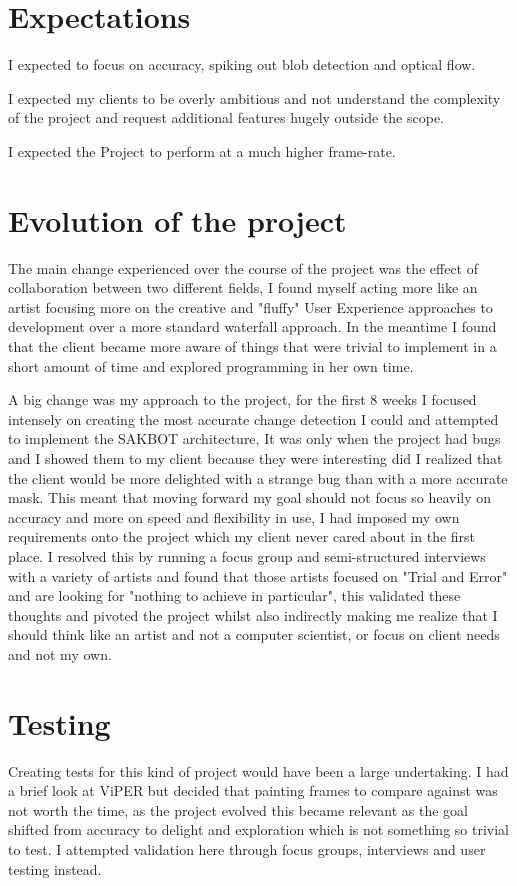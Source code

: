 \documentclass[a4paper]{report}
\begin{document}
\section{Expectations}
I expected to focus on accuracy, spiking out blob detection and optical flow.

I expected my clients to be overly ambitious and not understand the complexity of the project and request additional features hugely outside the scope.

I expected the Project to perform at a much higher frame-rate.

\section{Evolution of the project}
The main change experienced over the course of the project was the effect of collaboration between two different fields, I found myself acting more like an artist focusing more on the creative and "fluffy" User Experience approaches to development over a more standard waterfall approach. In the meantime I found that the client became more aware of things that were trivial to implement in a short amount of time and explored programming in her own time.

A big change was my approach to the project, for the first 8 weeks I focused intensely on creating the most accurate change detection I could and attempted to implement the SAKBOT architecture\cite{SAKBOT}, It was only when the project had bugs and I showed them to my client because they were interesting did I realized that the client would be more delighted with a strange bug than with a more accurate mask. This meant that moving forward my goal should not focus so heavily on accuracy and more on speed and flexibility in use, I had imposed my own requirements onto the project which my client never cared about in the first place. I resolved this by running a focus group and semi-structured interviews with a variety of artists and found that those artists focused on "Trial and Error" and are looking for "nothing to achieve in particular", this validated these thoughts and pivoted the project whilst also indirectly making me realize that I should think like an artist and not a computer scientist, or focus on client needs and not my own.

\section{Testing}
Creating tests for this kind of project would have been a large undertaking. I had a brief look at ViPER\cite{VIPER} but decided that painting frames to compare against was not worth the time, as the project evolved this became relevant as the goal shifted from accuracy to delight and exploration which is not something so trivial to test. I attempted validation here through focus groups, interviews and user testing instead.
\end{document}

